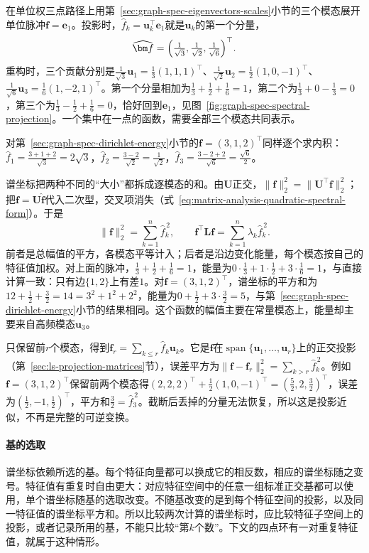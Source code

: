 在单位权三点路径上用第~\ref{sec:graph-spec-eigenvectors-scales}小节的三个模态展开单位脉冲$\bm f=\bm e_1$。投影时，$\widehat f_k=\bm u_k^{\top}\bm e_1$就是$\bm u_k$的第一个分量，
\[
 \widehat{\bm f}=\Bigl(\tfrac1{\sqrt3},\tfrac1{\sqrt2},\tfrac1{\sqrt6}\Bigr)^{\top}.
\]
重构时，三个贡献分别是$\tfrac1{\sqrt3}\bm u_1=\tfrac13(1,1,1)^{\top}$、$\tfrac1{\sqrt2}\bm u_2=\tfrac12(1,0,-1)^{\top}$、$\tfrac1{\sqrt6}\bm u_3=\tfrac16(1,-2,1)^{\top}$。第一个分量相加为$\tfrac13+\tfrac12+\tfrac16=1$，第二个为$\tfrac13+0-\tfrac13=0$，第三个为$\tfrac13-\tfrac12+\tfrac16=0$，恰好回到$\bm e_1$，见图~\ref{fig:graph-spec-spectral-projection}。一个集中在一点的函数，需要全部三个模态共同表示。

对第~\ref{sec:graph-spec-dirichlet-energy}小节的$\bm f=(3,1,2)^{\top}$同样逐个求内积：$\widehat f_1=\tfrac{3+1+2}{\sqrt3}=2\sqrt3$，$\widehat f_2=\tfrac{3-2}{\sqrt2}=\tfrac1{\sqrt2}$，$\widehat f_3=\tfrac{3-2+2}{\sqrt6}=\tfrac{\sqrt6}2$。

谱坐标把两种不同的“大小”都拆成逐模态的和。由$\bm U$正交，$\lVert\bm f\rVert_2^2=\lVert\bm U^{\top}\bm f\rVert_2^2$；把$\bm f=\bm U\widehat{\bm f}$代入二次型，交叉项消失（式~\eqref{eq:matrix-analysis-quadratic-spectral-form}）。于是
\begin{equation}
 \lVert\bm f\rVert_2^2=\sum_{k=1}^n\widehat f_k^{\,2},\qquad
 \bm f^{\top}\bm L\bm f=\sum_{k=1}^n\lambda_k\widehat f_k^{\,2}.
 \label{eq:graph-spec-parseval}
\end{equation}
前者是总幅值的平方，各模态平等计入；后者是沿边变化能量，每个模态按自己的特征值加权。对上面的脉冲，$\tfrac13+\tfrac12+\tfrac16=1$，能量为$0\cdot\tfrac13+1\cdot\tfrac12+3\cdot\tfrac16=1$，与直接计算一致：只有边$\{1,2\}$上有差$1$。对$\bm f=(3,1,2)^{\top}$，谱坐标的平方和为$12+\tfrac12+\tfrac32=14=3^2+1^2+2^2$，能量为$0+\tfrac12+3\cdot\tfrac32=5$，与第~\ref{sec:graph-spec-dirichlet-energy}小节的结果相同。这个函数的幅值主要在常量模态上，能量却主要来自高频模态$\bm u_3$。

只保留前$r$个模态，得到$\bm f_r=\sum_{k\leq r}\widehat f_k\bm u_k$。它是$\bm f$在$\operatorname{span}\{\bm u_1,\ldots,\bm u_r\}$上的正交投影（第~\ref{sec:ls-projection-matrices}节），误差平方为$\lVert\bm f-\bm f_r\rVert_2^2=\sum_{k>r}\widehat f_k^{\,2}$。例如$\bm f=(3,1,2)^{\top}$保留前两个模态得$(2,2,2)^{\top}+\tfrac12(1,0,-1)^{\top}=(\tfrac52,2,\tfrac32)^{\top}$，误差为$(\tfrac12,-1,\tfrac12)^{\top}$，平方和$\tfrac32=\widehat f_3^{\,2}$。截断后丢掉的分量无法恢复，所以这是投影近似，不再是完整的可逆变换。

\paragraph{基的选取}
谱坐标依赖所选的基。每个特征向量都可以换成它的相反数，相应的谱坐标随之变号。特征值有重复时自由更大：对应特征空间中的任意一组标准正交基都可以使用，单个谱坐标随基的选取改变。不随基改变的是到每个特征空间的投影，以及同一特征值的谱坐标平方和。所以比较两次计算的谱坐标时，应比较特征子空间上的投影，或者记录所用的基，不能只比较“第$k$个数”。下文的四点环有一对重复特征值，就属于这种情形。

